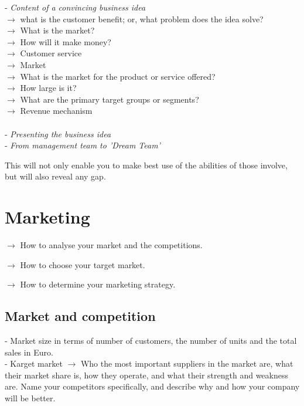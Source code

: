 \documentclass[11pt,a4paper]{article}
\begin{document}
- \emph{Content of a convincing business idea}\\
$\to$ what is the customer benefit; or, what problem does the idea solve?\\

$\to$ What is the market?\\

$\to$ How will it make money?\\

$\to$ Customer service\\

$\to$ Market\\

$\to$ What is the market for the product or service offered?\\

$\to$ How large is it?\\

$\to$ What are the primary target groups or segments?\\

$\to$ Revenue mechanism\\ \\

- \emph{Presenting the business idea}\\

- \emph{From management team to 'Dream Team'}

This will not only enable you to make best use of the abilities of those involve, but will also reveal any gap.

\section{Marketing}
$\to$ How to analyse your market and the competitions.

$\to$ How to choose your target market.

$\to$ How to determine your marketing strategy.

\subsection{Market and competition}
- Market size in terms of number of customers, the number of units and the total sales in Euro.\\

- Karget market $\to$ Who the most important suppliers in the market are, what their market share is, how they operate, and what their strength and weakness are. Name your competitors specifically, and describe why and how your company will be better.\\
\end{document}
